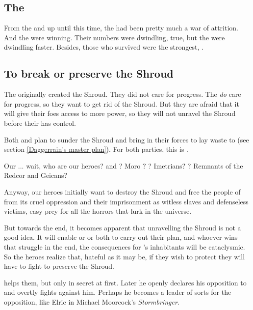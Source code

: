 \begin{garbage}
\subsection{The \Feud}
From the \Shrouding{} and up until this time, the \feud{} had been pretty much a war of attrition. 
And the \resphain{} were winning. 
Their numbers were dwindling, true, but the \dragons{} were dwindling faster. 
Besides, those \resphain{} who survived were the strongest, . 







\subsection{To break or preserve the Shroud}
The \dragons{} originally created the Shroud. They did not care for progress. The \resphain{} \emph{do} care for progress, so they want to get rid of the Shroud. But they are afraid that it will give their \draconic{} foes access to more \xsic{} power, so they will not unravel the Shroud before their \matrix{} has control. 

Both \Daggerrain{} and \Secherdamon{} plan to sunder the Shroud and bring in their forces to lay waste to \Miith{} (see section \ref{Daggerrain's master plan}). For both parties, this is .

Our ... wait, who are our heroes? \Narkiza{} and \Dzasselid? Moro \Cornel? \Cuezcans? Imetrians? \Ophidians? Remnants of the Redcor and Geicans?

Anyway, our heroes initially want to destroy the Shroud and free the people of \Miith{} from its cruel oppression and their imprisonment as witless slaves and defenseless victims, easy prey for all the horrors that lurk in the universe.

But towards the end, it becomes apparent that unravelling the Shroud is not a good idea. It will enable \Daggerrain{} or \Secherdamon{} or both to carry out their plan, and whoever wins that struggle in the end, the consequences for \Miith{}'s inhabitants will be cataclysmic. So the heroes realize that, hateful as it may be, if they wish to protect \Miith{} they will have to fight to preserve the Shroud.

\Ishnaruchaefir{} helps them, but only in secret at first. Later he openly declares his opposition to \Secherdamon{} and overtly fights against him. Perhaps he becomes a leader of sorts for the opposition, like Elric in Michael Moorcock's \emph{Stormbringer}.


\end{garbage}
